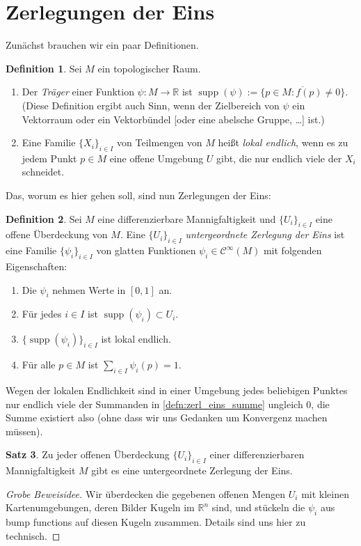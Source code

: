 \documentclass[a4paper]{scrreprt}
\numberwithin{equation}{chapter}
\DeclareMathOperator{\supp}{supp}
\newcommand{\R}{\mathbb{R}}
\newcommand{\sC}{\mathcal{C}^{\infty}}
\theoremstyle{definition}
\newtheorem{defn}{Definition}[section]
\newtheorem{satz}[defn]{Satz}
\begin{document}
\section{Zerlegungen der Eins}
Zunächst brauchen wir ein paar Definitionen.
\begin{defn}
	Sei $M$ ein topologischer Raum.
	\begin{enumerate}[label=(\alph*)]
		\item Der \emph{Träger} einer Funktion $\psi\colon M \to \R$ ist $\supp(\psi) := \overline{\{p \in M \colon f(p) \ne 0\}}$. (Diese Definition ergibt auch Sinn, wenn der Zielbereich von $\psi$ ein Vektorraum oder ein Vektorbündel [oder eine abelsche Gruppe, \dots] ist.)
		\item Eine Familie $\{X_i\}_{i\in I}$ von Teilmengen von $M$ heißt \emph{lokal endlich}, wenn es zu jedem Punkt $p\in M$ eine offene Umgebung $U$ gibt, die nur endlich viele der $X_i$ schneidet.
	\end{enumerate}
\end{defn}
Das, worum es hier gehen soll, sind nun Zerlegungen der Eins:
\begin{defn}
	Sei $M$ eine differenzierbare Mannigfaltigkeit und $\{U_i\}_{i\in I}$ eine offene Überdeckung von $M$. Eine $\{U_i\}_{i\in I}$ \emph{untergeordnete Zerlegung der Eins} ist eine Familie $\{\psi_i\}_{i\in I}$ von glatten Funktionen $\psi_i \in \sC(M)$ mit folgenden Eigenschaften:
	\begin{enumerate}[label=(\roman*)]
		\item Die $\psi_i$ nehmen Werte in $[0,1]$ an.
		\item Für jedes $i\in I$ ist $\supp(\psi_i) \subset U_i$.
		\item $\{\supp(\psi_i)\}_{i\in I}$ ist lokal endlich.
		\item \label{defn:zerl_eins_summe} Für alle $p\in M$ ist $\sum_{i\in I} \psi_i(p) = 1$.
	\end{enumerate}
	Wegen der lokalen Endlichkeit sind in einer Umgebung jedes beliebigen Punktes nur endlich viele der Summanden in \ref{defn:zerl_eins_summe} ungleich 0, die Summe existiert also (ohne dass wir uns Gedanken um Konvergenz machen müssen).
\end{defn}

\begin{satz}
	Zu jeder offenen Überdeckung $\{U_i\}_{i\in I}$ einer differenzierbaren Mannigfaltigkeit $M$ gibt es eine untergeordnete Zerlegung der Eins.

	\begin{proof}[Grobe Beweisidee]
		Wir überdecken die gegebenen offenen Mengen $U_i$ mit kleinen Kartenumgebungen, deren Bilder Kugeln im $\R^n$ sind, und stückeln die $\psi_i$ aus bump functions auf diesen Kugeln zusammen. Details sind uns hier zu technisch.
	\end{proof}
\end{satz}
\end{document}
